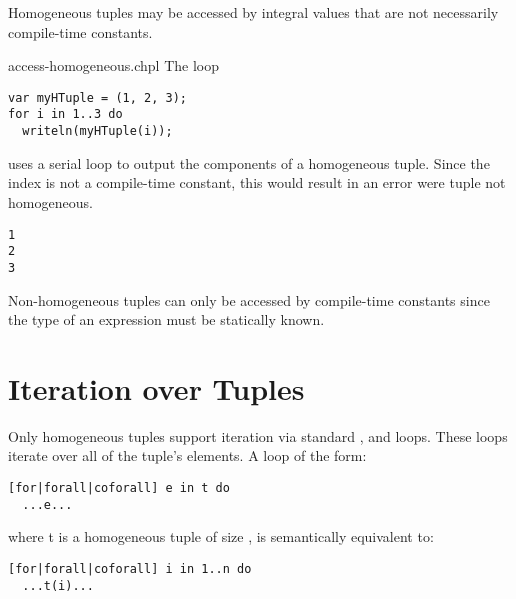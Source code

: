 Homogeneous tuples may be accessed by integral values that are not
necessarily compile-time constants.

\begin{chapelexample}{access-homogeneous.chpl}
The loop
\begin{chapel}
\begin{verbatim}
var myHTuple = (1, 2, 3);
for i in 1..3 do
  writeln(myHTuple(i));
\end{verbatim}
\end{chapel}
uses a serial loop to output the components of a homogeneous tuple.
Since the index is not a compile-time constant, this would result in
an error were tuple not homogeneous.
\begin{chapeloutput}
\begin{verbatim}
1
2
3
\end{verbatim}
\end{chapeloutput}
\end{chapelexample}

\begin{rationale}
Non-homogeneous tuples can only be accessed by compile-time constants
since the type of an expression must be statically known.
\end{rationale}

\section{Iteration over Tuples}
\label{Iteration_over_Tuples}

Only homogeneous tuples support iteration via
standard ,  and  loops.  These loops
iterate over all of the tuple's elements.  A loop of the form:

\begin{chapel}
\begin{verbatim}
[for|forall|coforall] e in t do
  ...e...
\end{verbatim}
\end{chapel}

where t is a homogeneous tuple of size , is semantically
equivalent to:

\begin{chapel}
\begin{verbatim}
[for|forall|coforall] i in 1..n do
  ...t(i)...
\end{verbatim}
\end{chapel}

